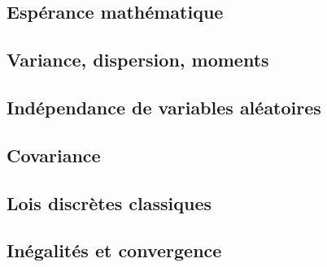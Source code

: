 \documentclass[11pt,twoside,a4paper]{article}
\begin{document}
\subsection{Espérance mathématique}

\subsection{Variance, dispersion, moments}

\subsection{Indépendance de variables aléatoires}

\subsection{Covariance}

\subsection{Lois discrètes classiques}

\subsection{Inégalités et convergence}
\end{document}
